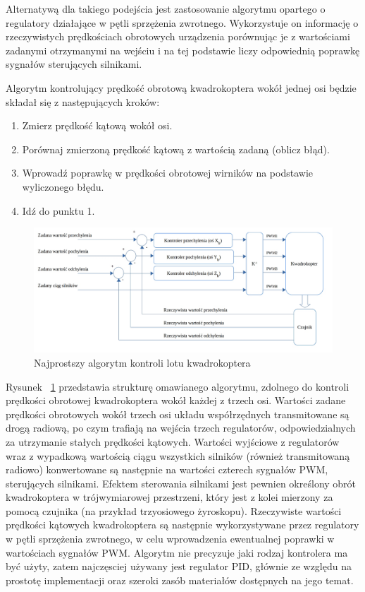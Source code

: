 Alternatywą dla takiego podejścia jest zastosowanie algorytmu opartego o regulatory działające w pętli sprzężenia zwrotnego. Wykorzystuje on informację o rzeczywistych prędkościach obrotowych urządzenia porównując je z wartościami zadanymi otrzymanymi na wejściu i na tej podstawie liczy odpowiednią poprawkę sygnałów sterujących silnikami. 

Algorytm kontrolujący prędkość obrotową kwadrokoptera wokół jednej osi będzie składał się z następujących kroków:

\begin{enumerate}
	\item Zmierz prędkość kątową wokół osi.
	\item Porównaj zmierzoną prędkość kątową z wartością zadaną (oblicz błąd).
	\item Wprowadź poprawkę w prędkości obrotowej wirników na podstawie wyliczonego błędu.
	\item Idź do punktu 1.
\end{enumerate}


\begin{figure}[H]
	\centering
	\includegraphics[width=1.1\textwidth]{Pictures/rate_controll_algorithm2.png}
		\caption[Najprostszy algorytm kontroli lotu kwadrokoptera]{Najprostszy algorytm kontroli lotu kwadrokoptera}
	\label{fig:rate_controll_algorithm}
\end{figure}

Rysunek ~\ref{fig:rate_controll_algorithm} przedstawia strukturę omawianego algorytmu, zdolnego do kontroli prędkości obrotowej kwadrokoptera wokół każdej z trzech osi. Wartości zadane prędkości obrotowych wokół trzech osi układu współrzędnych transmitowane są drogą radiową, po czym trafiają na wejścia trzech regulatorów, odpowiedzialnych za utrzymanie stałych prędkości kątowych. Wartości wyjściowe z regulatorów wraz z wypadkową wartością ciągu wszystkich silników (również transmitowaną radiowo) konwertowane są następnie na wartości czterech sygnałów PWM, sterujących silnikami. Efektem sterowania silnikami jest pewnien określony obrót kwadrokoptera w trójwymiarowej przestrzeni, który jest z kolei mierzony za pomocą czujnika (na przykład trzyosiowego żyroskopu). Rzeczywiste wartości prędkości kątowych kwadrokoptera są następnie wykorzystywane przez regulatory w pętli sprzężenia zwrotnego, w celu wprowadzenia ewentualnej poprawki w wartościach sygnałów PWM. Algorytm nie precyzuje jaki rodzaj kontrolera ma być użyty, zatem najczęsciej używany jest regulator PID, głównie ze względu na prostotę implementacji oraz szeroki zasób materiałów dostępnych na jego temat.

